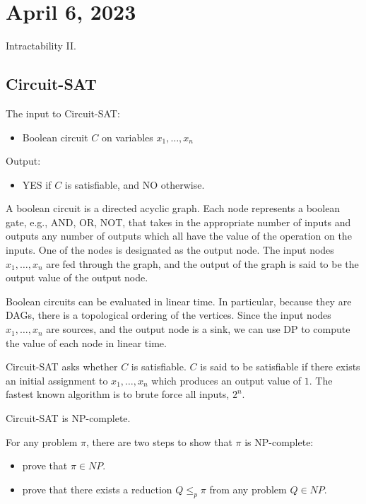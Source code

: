 \section{April 6, 2023}

Intractability II. 

\subsection{Circuit-SAT}

The input to Circuit-SAT:
\begin{itemize}
    \item Boolean circuit $C$ on variables $x_1, \hdots, x_n$
\end{itemize}
Output: 
\begin{itemize}
    \item YES if $C$ is satisfiable, and NO otherwise. 
\end{itemize}

\begin{definition}

A \ac{boolean circuit} is a directed acyclic graph. Each node represents a boolean gate, e.g., AND, OR, NOT, that takes in the appropriate number of inputs and outputs any number of outputs which all have the value of the operation on the inputs. One of the nodes is designated as the output node. The input nodes $x_1, \hdots, x_n$ are fed through the graph, and the output of the graph is said to be the output value of the output node. 
\end{definition}

Boolean circuits can be evaluated in linear time. In particular, because they are DAGs, there is a topological ordering of the vertices. Since the input nodes $x_1, \hdots, x_n$ are sources, and the output node is a sink, we can use DP to compute the value of each node in linear time. 

Circuit-SAT asks whether $C$ is satisfiable. $C$ is said to be \ac{satisfiable} if there exists an initial assignment to $x_1, \hdots, x_n$ which produces an output value of $1$. The fastest known algorithm is to brute force all inputs, $2^n$. 

\begin{theorem}

Circuit-SAT is NP-complete. 
\end{theorem}

For any problem $\pi$, there are two steps to show that $\pi$ is NP-complete:
\begin{itemize}
    \item prove that $\pi\in NP$. 
    \item prove that there exists a reduction $Q\leq_p \pi$ from any problem $Q\in NP$. 
\end{itemize}

